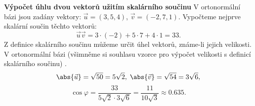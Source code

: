 \begin{mdframed}[style=mdexam]
  \begin{example}\label{mai:exam108}
    \textbf{Výpočet úhlu dvou vektorů užitím skalárního součinu}\newline
    V ortonormální bázi jsou zadány vektory: \(\vec{u}=(3,5,4)\), \(\vec{v}=(-2,7,1)\). Vypočteme
    nejprve skalární součin těchto vektorů:
    \begin{equation*}
      \vec{u}\vec{v} = 3\cdot(-2) + 5\cdot7 + 4\cdot1 = 33.
    \end{equation*}
    Z definice skalárního součinu můžeme určit úhel vektorů, známe-li jejich velikosti. V
    ortonormální bázi (všimněme si souhlasu vzorce pro výpočet velikosti s definicí skalárního
    součinu) \cite[s.~27]{Musilova2012MA2}.
    \begin{equation*}
      \abs{\vec{u}} = \sqrt{50} = 5\sqrt{2},\; \abs{\vec{v}} = \sqrt{54} = 3\sqrt{6},
    \end{equation*}    
    \begin{equation*}
      \cos\varphi = \dfrac{33}{5\sqrt{2}\cdot3\sqrt{6}} = \dfrac{11}{10\sqrt{3}}\approx\num{0.635}.
    \end{equation*}
    {\centering
      \captionsetup{type=figure}
      \label{fyz:fig225}
    \par}
  \end{example}
\end{mdframed}